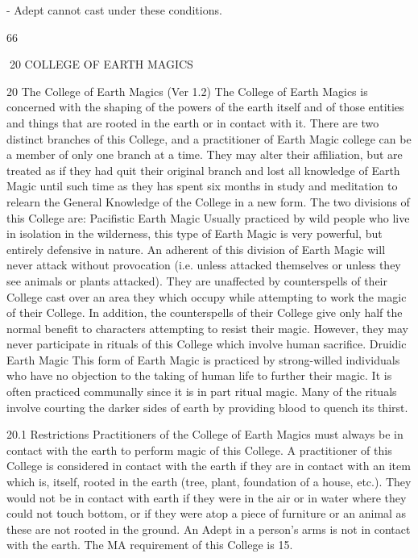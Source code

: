 \documentclass[a4paper]{article}
\begin{document}
\begin{multicols}{3}
- Adept cannot cast under these conditions.

66

20 COLLEGE OF EARTH MAGICS

20 The College of Earth Magics (Ver 1.2)
The College of Earth Magics is concerned with the
shaping of the powers of the earth itself and of
those entities and things that are rooted in the earth
or in contact with it.
There are two distinct branches of this College, and
a practitioner of Earth Magic college can be a
member of only one branch at a time. They may
alter their affiliation, but are treated as if they had
quit their original branch and lost all knowledge of
Earth Magic until such time as they has spent six
months in study and meditation to relearn the General Knowledge of the College in a new form. The
two divisions of this College are:
Pacifistic Earth Magic Usually practiced by wild
people who live in isolation in the wilderness, this
type of Earth Magic is very powerful, but entirely
defensive in nature. An adherent of this division of
Earth Magic will never attack without provocation
(i.e. unless attacked themselves or unless they see
animals or plants attacked). They are unaffected by
counterspells of their College cast over an area
they which occupy while attempting to work the
magic of their College. In addition, the counterspells of their College give only half the normal
benefit to characters attempting to resist their
magic. However, they may never participate in
rituals of this College which involve human sacrifice.
Druidic Earth Magic This form of Earth Magic is
practiced by strong-willed individuals who have no
objection to the taking of human life to further
their magic. It is often practiced communally since
it is in part ritual magic. Many of the rituals involve courting the darker sides of earth by providing blood to quench its thirst.

20.1 Restrictions
Practitioners of the College of Earth Magics must
always be in contact with the earth to perform
magic of this College.
A practitioner of this College is considered in
contact with the earth if they are in contact with an
item which is, itself, rooted in the earth (tree, plant,
foundation of a house, etc.). They would not be in
contact with earth if they were in the air or in water
where they could not touch bottom, or if they were
atop a piece of furniture or an animal as these are
not rooted in the ground. An Adept in a person’s
arms is not in contact with the earth.
The MA requirement of this College is 15.


\end{multicols}
\end{document}

